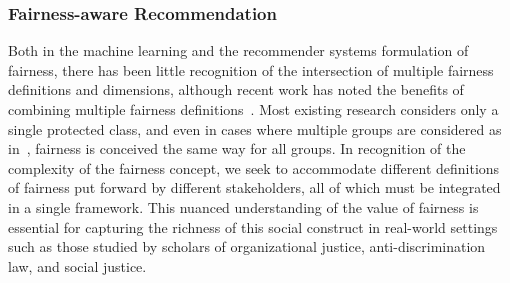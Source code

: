 \subsubsection{\textbf{Fairness-aware Recommendation}}
\hfill

Both in the machine learning and the recommender systems formulation of fairness, there has been little recognition of the intersection of multiple fairness definitions and dimensions, although recent work has noted the benefits of combining multiple fairness definitions~\cite{beutel2019fairness}. Most existing research considers only a single protected class, and even in cases where multiple groups are considered as in~\cite{buolamwini2018gender,hebert2018multicalibration,kearns2017preventing,zhu2018fairness}, fairness is conceived the same way for all groups. In recognition of the complexity of the fairness concept, we seek to accommodate different definitions of fairness put forward by different stakeholders, all of which must be integrated in a single framework. This nuanced understanding of the value of fairness is essential for capturing the richness of this social construct in real-world settings such as those studied by scholars of organizational justice, anti-discrimination law, and social justice.

